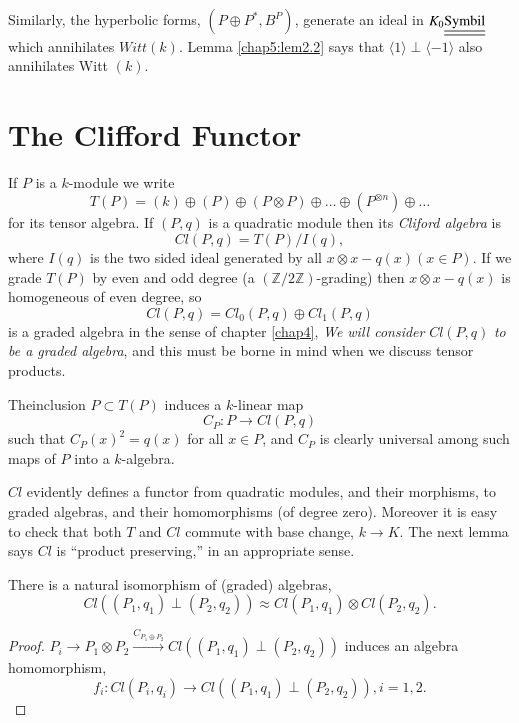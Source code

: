 Similarly, the hyperbolic forms, $(P \oplus P^*, B^P)$, generate an
ideal in $K_0 \underline{\underline{\rm Symbil}}$ which annihilates
$Witt (k)$. Lemma \ref{chap5:lem2.2} says that $\langle 1 \rangle
\perp \langle -1 \rangle$ also annihilates Witt $(k)$.  


\section{The Clifford Functor}\label{chap5:sec3}%

If $P$ is a $k$-module we write
$$
T(P) = (k) \oplus (P) \oplus (P \otimes P) \oplus \ldots \oplus 
(P^{\otimes n}) \oplus \ldots 
$$
for its tensor algebra. If $(P, q)$ is a quadratic module then its
\textit{Cliford algebra} is 
$$
Cl (P, q) = T(P) / I (q), 
$$ 
where $I(q)$ is the two sided ideal generated by all $x \otimes x -
q(x)(x \in P)$. If we grade $T(P)$ by even and odd degree (a $(
\mathbb{Z} /2 \mathbb{Z})$-grading) then $x \otimes x - q(x)$ is
homogeneous of even degree, so 
$$ 
Cl (P, q) = Cl_0 (P, q) \oplus Cl_1 (P, q) 
$$
is a graded algebra in the sense of chapter \ref{chap4}, \textit{We will
  consider} $Cl (P, q)$ \textit{to be a graded algebra}, and this must
be borne in mind when we discuss tensor products. 

The\pageoriginale inclusion $P \subset T(P)$ induces a $k$-linear map
$$
C_P : P \to Cl (P, q)
$$
such that $C_P(x)^2 = q(x)$ for all $x \in P$, and $C_P$ is clearly
universal among such maps of $P$ into a $k$-algebra. 

$Cl$ evidently defines a functor from quadratic modules, and their
morphisms, to graded algebras, and their homomorphisms (of degree
zero). Moreover it is easy to check that both $T$ and $Cl$ commute
with base change, $k \to K$. The next lemma says $Cl$ is ``product
preserving,'' in an appropriate sense. 

\begin{lemma}\label{chap5:lem3.1}%
There is a natural isomorphism of (graded) algebras, 
$$
Cl ((P_1, q_1) \perp (P_2, q_2)) \approx Cl (P_1, q_1) \otimes Cl
(P_2, q_2). 
$$
\end{lemma}

\begin{proof}%
$P_i \to P_1 \otimes P_2 \xrightarrow{C_{P_1 \oplus P_2}} Cl ((P_1,
  q_1) \perp (P_2, q_2))$ induces an algebra homomorphism, 
$$
f_i : Cl (P_i, q_i) \to Cl ((P_1, q_1) \perp (P_2, q_2)), i= 1, 2. 
$$
\end{proof}

